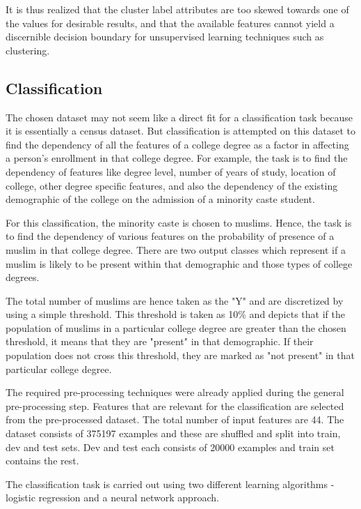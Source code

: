 It is thus realized that the cluster label attributes are too skewed towards one of the values for desirable results, and that the available features cannot yield a discernible decision boundary for unsupervised learning techniques such as clustering. 


\subsection{Classification}

The chosen dataset may not seem like a direct fit for a classification task because it is essentially a census dataset. But classification is attempted on this dataset to find the dependency of all the features of a college degree as a factor in affecting a person's enrollment in that college degree. For example, the task is to find the dependency of features like degree level, number of years of study, location of college, other degree specific features, and also the dependency of the existing demographic of the college on the admission of a minority caste student.

For this classification, the minority caste is chosen to muslims. Hence, the task is to find the dependency of various features on the probability of presence of a muslim in that college degree. There are two output classes which represent if a muslim is likely to be present within that demographic and those types of college degrees. 

The total number of muslims are hence taken as the "Y" and are discretized by using a simple threshold. This threshold is taken as 10\% and depicts that if the population of muslims in a particular college degree are greater than the chosen threshold, it means that they are "present" in that demographic. If their population does not cross this threshold, they are marked as "not present" in that particular college degree.

The required pre-processing techniques were already applied during the general pre-processing step. Features that are relevant for the classification are selected from the pre-processed dataset. The total number of input features are 44. The dataset consists of 375197 examples and these are shuffled and split into train, dev and test sets. Dev and test each consists of 20000 examples and train set contains the rest.

The classification task is carried out using two different learning algorithms - logistic regression and a neural network approach. 

